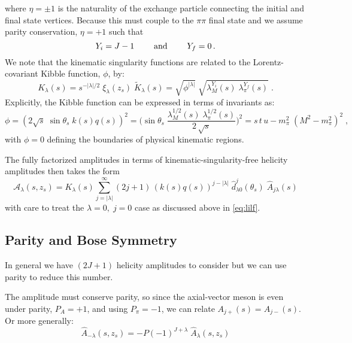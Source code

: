 where \(\eta = \pm1\) is the naturality of the exchange particle connecting the initial and final state vertices. Because this must couple to the \(\pi\pi\) final state and we assume parity conservation, \(\eta = +1\) such that
  \begin{equation}
    Y_i =  J - 1 \qquad \text{ and } \qquad  Y_f =  0 \, .
    \end{equation}
We note that the kinematic singularity functions are related to the Lorentz-covariant Kibble function, \(\phi\), by:
  \begin{equation}
    \label{eq:k-factor}
    K_\lambda(s) = s^{-|\lambda|/2} \; \xi_{\lambda}(z_s) \; \tilde{K}_{\lambda}(s) = \sqrt{\phi^{|\lambda|}} \; \sqrt{\lambda_M^{Y_i}(s) \; \lambda_\pi^{Y_f}(s)}\;  .
  \end{equation}
Explicitly, the Kibble function can be expressed in terms of invariants as:
  \begin{equation} \label{eq:kibble}
    \phi = (2\sqrt{s} \; \sin \theta_s \; k(s) q(s))^2 =  \bigg( \sin\theta_s \; \frac{\lambda^{1/2}_M(s) \; \lambda^{1/2}_\pi(s)}{2 \,\sqrt{s}} \bigg)^2 = s \, t\, u - m_\pi^2 \;(M^2 - m_\pi^2)^2 \; ,
  \end{equation}
with \(\phi = 0\) defining the boundaries of physical kinematic regions.

The fully factorized amplitudes in terms of kinematic-singularity-free helicity amplitudes then takes the form
  \begin{equation}
    \label{eq:helicity-final}
    \mathcal{A}_\lambda(s,z_s) =  K_{\lambda}(s)  \sum_{j= |\lambda|}^\infty (2j+1) \, (k(s)q(s))^{j- |\lambda|} \; \hat{d}^j_{\lambda0}(\theta_s)  \; \hat{A}_{j\lambda}(s)
  \end{equation}
with care to treat the \(\lambda =0, \;  j=0\) case as discussed above in \cref{eq:lilf}.
\subsection{Parity and Bose Symmetry} \label{sec:symmetry}
In general we have \((2J+1)\) helicity amplitudes to consider but we can use parity to reduce this number.

The amplitude must conserve parity, so since the axial-vector meson is even under parity, \( P_A = +1\), and using \(P_\pi = -1\), we can relate \(A_{j+}(s) = A_{j-}(s)\). Or more generally:
  \begin{equation}
    \label{parity-jpc}
    \hat{A}_{-\lambda}(s,z_s) = -P(-1)^{J+\lambda} \; \hat{A}_{\lambda}(s,z_s)
  \end{equation}

